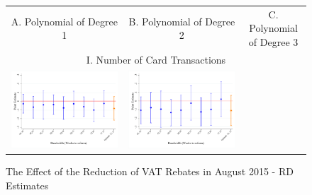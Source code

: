 \documentclass[12pt,notitlepage,a4paper]{article}
\begin{document}
\begin{landscape}
\centering\begin{figure}[ht]
\captionsetup{justification=centering}
\caption{The Effect of the Reduction of VAT Rebates in August 2015 - RD Estimates }
\label{fig:rd_robust_2014_0815}
{\centering\begin{tabular}{c c c }
A. Polynomial of Degree 1  & B. Polynomial of Degree 2 & C. Polynomial of Degree 3 \\
\multicolumn{3}{c}{I.  Number of Card Transactions} \\
\includegraphics[scale=.4]{output/robust_log_count_trans_1_d_w_0815.pdf} &
\includegraphics[scale=.4]{output/robust_log_count_trans_2_d_w_0815.pdf} &

\end{tabular}}
\end{figure}
\end{landscape}
\end{document}
